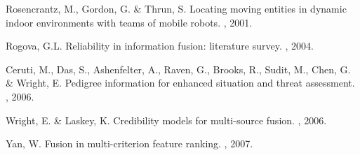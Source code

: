 \begin{frame}[allowframebreaks]
\begin{thebibliography}{10}
                                {\sc Rosencrantz, M., Gordon, G. \& Thrun, S.}
                                \newblock Locating moving entities in dynamic indoor environments with teams of mobile robots.
                                , 2001.

                                {\sc Rogova, G.L.}
                                \newblock Reliability in information fusion: literature survey.
                                , 2004.

                                {\sc Ceruti, M., Das, S., Ashenfelter, A., Raven, G., Brooks, R., Sudit, M., Chen, G. \& Wright, E.}
                                \newblock Pedigree information for enhanced situation and threat assessment.
                                , 2006.

                                {\sc Wright, E. \& Laskey, K.}
                                \newblock Credibility models for multi-source fusion.
                                , 2006.

                                {\sc Yan, W.}
                                \newblock Fusion in multi-criterion feature ranking.
                                , 2007.

                \end{thebibliography}
        \end{frame}
